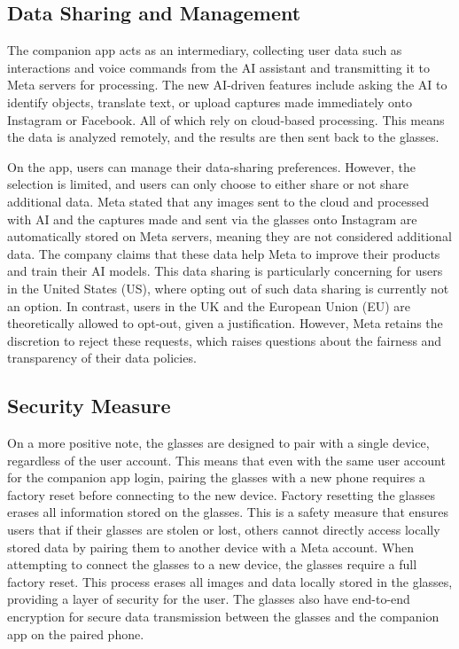 \subsection*{Data Sharing and Management}
The companion app acts as an intermediary, collecting user data such as interactions and voice commands from the AI assistant and transmitting it to Meta servers for processing. The new AI-driven features include asking the AI to identify objects, translate text, or upload captures made immediately onto Instagram or Facebook. All of which rely on cloud-based processing. This means the data is analyzed remotely, and the results are then sent back to the glasses.

On the app, users can manage their data-sharing preferences. However, the selection is limited, and users can only choose to either share or not share additional data. Meta stated that any images sent to the cloud and processed with AI and the captures made and sent via the glasses onto Instagram are automatically stored on Meta servers, meaning they are not considered additional data. The company claims that these data help Meta to improve their products and train their AI models. This data sharing is particularly concerning for users in the United States (US), where opting out of such data sharing is currently not an option. In contrast, users in the UK and the European Union (EU) are theoretically allowed to opt-out, given a justification. However, Meta retains the discretion to reject these requests, which raises questions about the fairness and transparency of their data policies.


\subsection*{Security Measure}
On a more positive note, the glasses are designed to pair with a single device, regardless of the user account. This means that even with the same user account for the companion app login, pairing the glasses with a new phone requires a factory reset before connecting to the new device. Factory resetting the glasses erases all information stored on the glasses. This is a safety measure that ensures users that if their glasses are stolen or lost, others cannot directly access locally stored data by pairing them to another device with a Meta account. When attempting to connect the glasses to a new device, the glasses require a full factory reset. This process erases all images and data locally stored in the glasses, providing a layer of security for the user. The glasses also have end-to-end encryption for secure data transmission between the glasses and the companion app on the paired phone.

 

